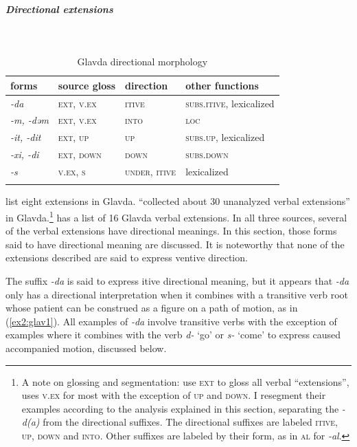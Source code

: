 \newpage
\subparagraph{Directional extensions}~

\begin{table}[H]
	\caption{Glavda directional morphology}
	\label{tab:glav}
	\begin{tabular}{llll} %
		\lsptoprule
		forms & source gloss & direction  & other functions  \\ %
		\midrule
		\textit{-da}  &  \textsc{ext, v.ex}  &  \textsc{itive}  &  \textsc{subs.itive}, lexicalized   \\
		\textit{-m, -dəm}  &  \textsc{ext, v.ex}  & \textsc{into}   &  \textsc{loc}  \\	
		\textit{-it, -dit}  &  \textsc{ext, up}  & \textsc{up}  & \textsc{subs.up}, lexicalized    \\
		\textit{-xi, -di}  &  \textsc{ext, down}  &  \textsc{down}  & \textsc{subs.down}  \\
		\textit{-s}  &  \textsc{v.ex, s}  & \textsc{under, itive}   &  lexicalized  \\
		\lspbottomrule
	\end{tabular}
\end{table} 

\citet[125--126]{rappDictionaryGlavdaLanguage1968} list eight extensions in Glavda. \citet[662]{bubaGlavdaMorphology2007} “collected about 30 unanalyzed verbal extensions” in Glavda.\footnote{A note on glossing and segmentation: \citet{bubaGlavdaMorphology2007} use \textsc{ext} to gloss all verbal ``extensions'', \citet{nghagyiyaSketchGlavdaGrammar2011} uses \textsc{v.ex} for most with the exception of \textsc{up} and \textsc{down}. I resegment their examples according to the analysis explained in this section, separating the \textit{-d(a)} from the directional suffixes. The directional suffixes are labeled \textsc{itive}, \textsc{up}, \textsc{down} and \textsc{into}. Other suffixes are labeled by their form, as in \textsc{al} for \textit{-al}.} \citet[22--27]{nghagyiyaSketchGlavdaGrammar2011} has a list of 16 Glavda verbal extensions. In all three sources, several of the verbal extensions have directional meanings. In this section, those forms said to have directional meaning are discussed. It is noteworthy that none of the extensions described are said to express ventive direction.

The suffix \textit{-da} is said to express itive directional meaning, but it appears that \textit{-da} only has a directional interpretation when it combines with a transitive verb root whose patient can be construed as a figure on a path of motion, as in (\ref{ex2:glav1}). All examples of \textit{-da} involve transitive verbs with the exception of examples where it combines with the verb \textit{d-} `go' or \textit{s-} `come' to express caused accompanied motion, discussed below.

